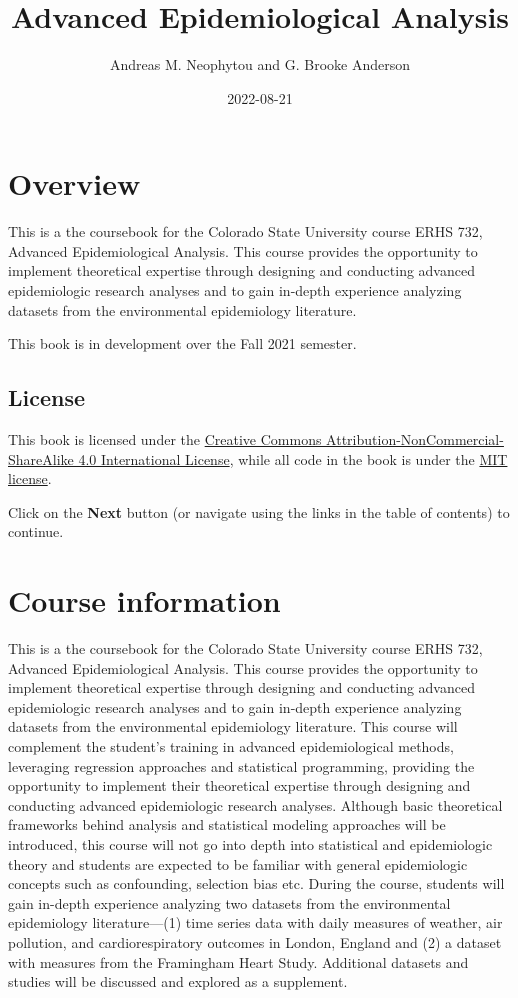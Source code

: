 \documentclass[
]{book}
\title{Advanced Epidemiological Analysis}
\author{Andreas M. Neophytou and G. Brooke Anderson}
\date{2022-08-21}
\begin{document}
\maketitle

{
\setcounter{tocdepth}{1}
\tableofcontents
}
\hypertarget{overview}{%
\chapter{Overview}\label{overview}}

This is a the coursebook for the Colorado State University course ERHS 732,
Advanced Epidemiological Analysis. This course provides the opportunity to
implement theoretical expertise through designing and conducting advanced
epidemiologic research analyses and to gain in-depth experience analyzing
datasets from the environmental epidemiology literature.

This book is in development over the Fall 2021 semester.

\hypertarget{license}{%
\section{License}\label{license}}

This book is licensed under the \href{https://creativecommons.org/licenses/by-nc-sa/4.0/}{Creative Commons
Attribution-NonCommercial-ShareAlike 4.0 International
License}, while all code in
the book is under the \href{https://opensource.org/licenses/MIT}{MIT license}.

Click on the \textbf{Next} button (or navigate using the links in the table of
contents) to continue.

\hypertarget{courseinfo}{%
\chapter{Course information}\label{courseinfo}}

This is a the coursebook for the Colorado State University course ERHS 732,
Advanced Epidemiological Analysis. This course provides the opportunity to
implement theoretical expertise through designing and conducting advanced
epidemiologic research analyses and to gain in-depth experience analyzing
datasets from the environmental epidemiology literature. This course will
complement the student's training in advanced epidemiological methods,
leveraging regression approaches and statistical programming, providing the
opportunity to implement their theoretical expertise through designing and
conducting advanced epidemiologic research analyses. Although basic theoretical frameworks behind analysis and statistical modeling approaches will be introduced, this course will not go into depth into statistical and epidemiologic theory and students are expected to be familiar with general epidemiologic concepts such as confounding, selection bias etc. During the course,
students will gain in-depth experience analyzing two datasets from the
environmental epidemiology literature---(1) time series data with daily measures
of weather, air pollution, and cardiorespiratory outcomes in London, England and
(2) a dataset with measures from the Framingham Heart Study. Additional datasets
and studies will be discussed and explored as a supplement.
\end{document}
